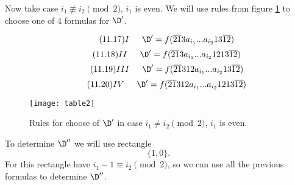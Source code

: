 Now take case $i_1 \not\equiv i_2 \pmod 2$, $i_1$ is even. We will use rules from figure \ref{table2} to choose one of 4 formulas for $\D'$.

\begin{equation}\tag{11.17}
	I \hspace{15pt}
	\D' = f(\overline{21}3a_{i_1}... a_{i_2}13\overline{12})
\end{equation}
\begin{equation}\tag{11.18}
	II \hspace{15pt}
	\D' = f(\overline{21}3a_{i_1}... a_{i_2}1213\overline{12})
\end{equation}
\begin{equation}\tag{11.19}
	III \hspace{15pt}
	\D' = f(\overline{21}312a_{i_1}... a_{i_2}13\overline{12})
\end{equation}
\begin{equation}\tag{11.20}
	IV \hspace{15pt}
	\D' = f(\overline{21}312a_{i_1}... a_{i_2}1213\overline{12})
\end{equation}

\begin{figure}[ht]
	\centering
	\texttt{[image: table2]}
	\caption{Rules for choose of $\D'$ in case $i_1 \ne i_2 \pmod 2$, $i_1$ is even.}
	\label{table2}
\end{figure}

To determine $\D''$ we will use rectangle
$$\{1, 0\}.$$
For this rectangle have $i_1 - 1 \equiv i_2 \pmod 2$, so we can use all the previous formulas to determine $\D''$.
